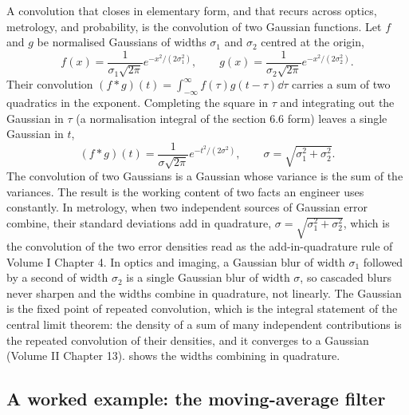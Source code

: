 A convolution that closes in elementary form, and that recurs across
optics, metrology, and probability, is the convolution of two Gaussian
functions. Let $f$ and $g$ be normalised Gaussians of widths
$\sigma_{1}$ and $\sigma_{2}$ centred at the origin,
\[
f(x) = \frac{1}{\sigma_{1}\sqrt{2\pi}}e^{-x^{2}/(2\sigma_{1}^{2})},
\qquad
g(x) = \frac{1}{\sigma_{2}\sqrt{2\pi}}e^{-x^{2}/(2\sigma_{2}^{2})}.
\]
Their convolution $(f * g)(t) = \int_{-\infty}^{\infty} f(\tau)
g(t - \tau)\dd\tau$ carries a sum of two quadratics in the exponent.
Completing the square in $\tau$ and integrating out the Gaussian in
$\tau$ (a normalisation integral of the section 6.6 form) leaves a
single Gaussian in $t$,
\[
(f * g)(t) = \frac{1}{\sigma\sqrt{2\pi}}e^{-t^{2}/(2\sigma^{2})},
\qquad \sigma = \sqrt{\sigma_{1}^{2} + \sigma_{2}^{2}}.
\]
The convolution of two Gaussians is a Gaussian whose variance is the
sum of the variances. The result is the working content of two facts
an engineer uses constantly. In metrology, when two independent
sources of Gaussian error combine, their standard deviations add in
quadrature, $\sigma = \sqrt{\sigma_{1}^{2} + \sigma_{2}^{2}}$, which is
the convolution of the two error densities read as the
add-in-quadrature rule of Volume I Chapter 4. In optics and imaging, a
Gaussian blur of width $\sigma_{1}$ followed by a second of width
$\sigma_{2}$ is a single Gaussian blur of width $\sigma$, so cascaded
blurs never sharpen and the widths combine in quadrature, not
linearly. The Gaussian is the fixed point of repeated convolution,
which is the integral statement of the central limit theorem: the
density of a sum of many independent contributions is the repeated
convolution of their densities, and it converges to a Gaussian
(Volume II Chapter 13).
 shows the widths combining
in quadrature.



\subsection{A worked example: the moving-average filter}

